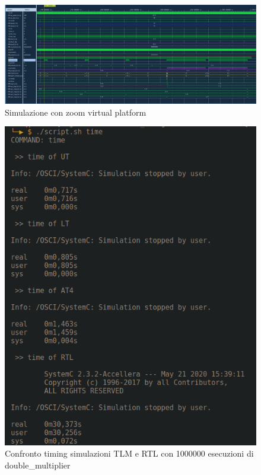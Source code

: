 \documentclass[]{IEEEtran}
\begin{document}
\begin{figure}[bt]
    \centering
    \includegraphics[width=\textwidth]{figures/SIM_VP_ZOOM.png}
    \caption{Simulazione con zoom virtual platform}
    \label{fig:SIM_VP_ZOOM}
\end{figure}


\begin{figure}[bt]
    \centering
    \includegraphics[width=\textwidth]{figures/SIM_TLM_timing.png}
    \caption{Confronto timing simulazioni TLM e RTL con 1000000 esecuzioni di double\_multiplier}
    \label{fig:SIM_TLM_TIME}
\end{figure}
\end{document}
